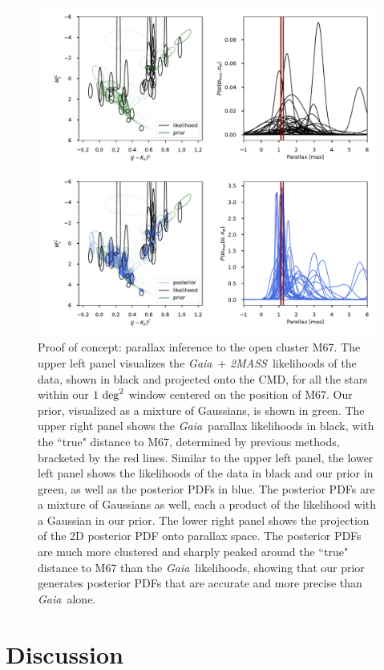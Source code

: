 \documentclass[modern]{aastex61}
\newcommand{\acronym}[1]{{\small{#1}}}
\newcommand{\project}[1]{\textsl{#1}}
\newcommand{\tmass}{\project{\acronym{2MASS}}}
\newcommand{\gaia}{\project{Gaia}}
\newcommand{\cmd}{\acronym{CMD}}
\begin{document}
\begin{figure}
\centering
  \includegraphics[width=\textwidth]{m67.pdf}
\caption{Proof of concept: parallax inference to the open cluster M67.
The upper left panel visualizes the \gaia\ + \tmass\ likelihoods of the data, shown in black and projected onto the \cmd, for all the stars within our $1~{\rm deg}^2$ window centered on the position of M67.
Our prior, visualized as a mixture of Gaussians, is shown in green.
The upper right panel shows the \gaia\ parallax likelihoods in black, with the ``true" distance to M67, determined by previous methods, bracketed by the red lines.
Similar to the upper left panel, the lower left panel shows the likelihoods of the data in black and our prior in green, as well as the posterior PDFs in blue.
The posterior PDFs are a mixture of Gaussians as well, each a product of the likelihood with a Gaussian in our prior.
The lower right panel shows the projection of the 2D posterior PDF onto parallax space.
The posterior PDFs are much more clustered and sharply peaked around the ``true" distance to M67 than the \gaia\ likelihoods, showing that our prior generates posterior PDFs that are accurate and more precise than \gaia\ alone.}
\label{fig:m67}
\end{figure}


\section{Discussion}
\end{document}
